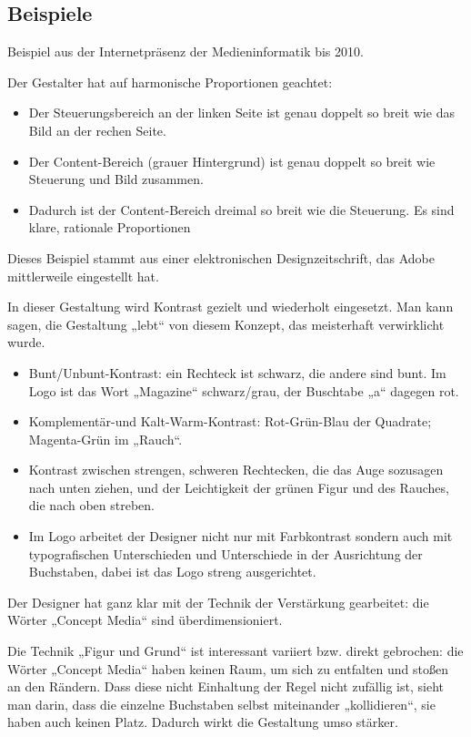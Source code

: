 \subsection{Beispiele}
Beispiel aus der Internetpräsenz der Medieninformatik bis 2010. 

Der Gestalter hat auf harmonische Proportionen geachtet:
\begin{itemize}
\item Der Steuerungsbereich an der linken Seite ist genau doppelt so breit wie das Bild an der rechen Seite.
\item Der Content-Bereich (grauer Hintergrund) ist genau doppelt so breit wie Steuerung und Bild zusammen. 
\item Dadurch ist der Content-Bereich dreimal so breit wie die Steuerung. Es sind klare, rationale Proportionen
\end{itemize}

Dieses Beispiel stammt aus einer elektronischen Designzeitschrift, das Adobe mittlerweile eingestellt hat.

In dieser Gestaltung wird Kontrast gezielt und wiederholt eingesetzt. Man kann sagen, die Gestaltung „lebt“ von diesem Konzept, das meisterhaft verwirklicht wurde.

\begin{itemize}
\item Bunt/Unbunt-Kontrast: ein Rechteck ist schwarz, die andere sind bunt. Im Logo ist das Wort „Magazine“ schwarz/grau, der Buschtabe „a“ dagegen rot.
\item Komplementär-und Kalt-Warm-Kontrast: Rot-Grün-Blau der Quadrate; Magenta-Grün im „Rauch“.
\item Kontrast zwischen strengen, schweren Rechtecken, die das Auge sozusagen nach unten ziehen, und der Leichtigkeit der grünen Figur und des Rauches, die nach oben streben.
\item Im Logo arbeitet der Designer nicht nur mit Farbkontrast sondern auch mit typografischen Unterschieden und Unterschiede in der Ausrichtung der Buchstaben, dabei ist das Logo streng ausgerichtet.
\end{itemize}

Der Designer hat ganz klar mit der Technik der Verstärkung gearbeitet: die Wörter „Concept Media“ sind überdimensioniert. 

Die Technik „Figur und Grund“ ist interessant variiert bzw. direkt gebrochen: die Wörter „Concept Media“ haben keinen Raum, um sich zu entfalten und stoßen an den Rändern. Dass diese nicht Einhaltung der Regel nicht zufällig ist, sieht man darin, dass die einzelne Buchstaben selbst miteinander „kollidieren“, sie haben auch keinen Platz. Dadurch wirkt die Gestaltung umso stärker. 

